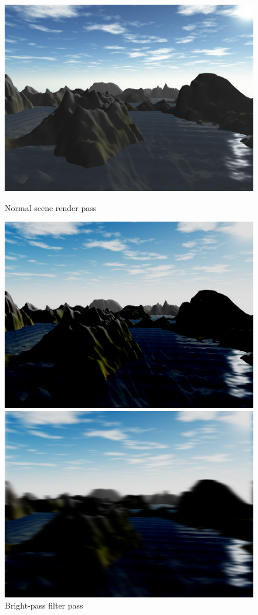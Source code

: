 \documentclass[11pt,a4paper,twoside,openright]{report}
\begin{document}
\begin{figure}[!htb]
  \includegraphics[width=\linewidth]{shader0-no-effect-screenshot.png}
  \caption{Normal scene render pass}\label{fig:1stpass}
\endminipage\hfill
{}
  \includegraphics[width=\linewidth]{shader1-brightpass-screenshot.png}
  \caption{Bright-pass filter pass}\label{fig:2ndpass}
\endminipage\hfill
{}%
  \includegraphics[width=\linewidth]{shader2-horizontal-blur-screenshot.png}

\end{figure}
\end{document}
